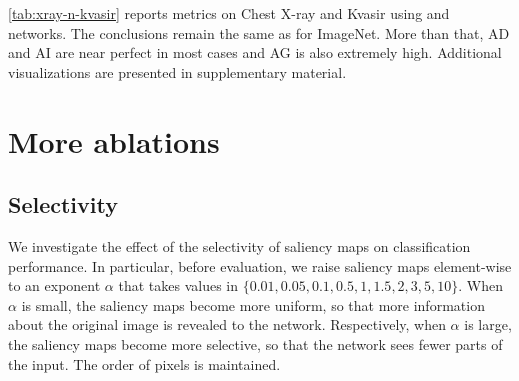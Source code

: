 \autoref{tab:xray-n-kvasir} reports metrics  on Chest X-ray and Kvasir using  and  networks. The conclusions remain the same as for ImageNet.  More than that, AD and AI are near perfect in most cases and AG is also extremely high.
Additional visualizations are presented in supplementary material.



\section{More ablations}
\label{sec:more-ablation}

\subsection{Selectivity}

We investigate the effect of the selectivity of saliency maps on classification performance. In particular, before evaluation, we raise saliency maps element-wise to an exponent $\alpha$ that takes values in $\{0.01,0.05,0.1,0.5,1,1.5,2,3,5,10\}$. When $\alpha$ is small, the saliency maps become more uniform, so that more information about the original image is revealed to the network. Respectively, when $\alpha$ is large, the saliency maps become more selective, so that the network sees fewer parts of the input. The order of pixels is maintained.


